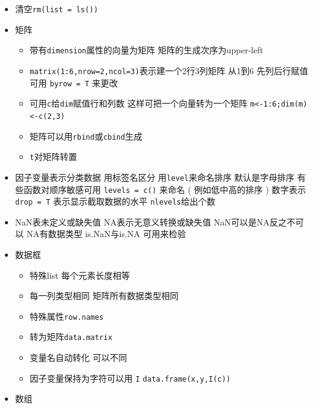 \documentclass[]{book}
\providecommand{\tightlist}{%
  \setlength{\itemsep}{0pt}\setlength{\parskip}{0pt}}
\begin{document}
\begin{itemize}
\tightlist
\item
  清空\texttt{rm(list\ =\ ls())}
\item
  矩阵

  \begin{itemize}
  \tightlist
  \item
    带有\texttt{dimension}属性的向量为矩阵 矩阵的生成次序为upper-left
  \item
    \texttt{matrix(1:6,nrow=2,ncol=3)}表示建一个2行3列矩阵 从1到6 先列后行赋值 可用 \texttt{byrow\ =\ T} 来更改
  \item
    可用\texttt{c}给\texttt{dim}赋值行和列数 这样可把一个向量转为一个矩阵 \texttt{m\textless{}-1:6;dim(m)\textless{}-c(2,3)}
  \item
    矩阵可以用\texttt{rbind}或\texttt{cbind}生成
  \item
    \texttt{t}对矩阵转置
  \end{itemize}
\item
  因子变量表示分类数据 用标签名区分 用\texttt{level}来命名排序 默认是字母排序 有些函数对顺序敏感可用 \texttt{levels\ =\ c()} 来命名 ( 例如低中高的排序 ) 数字表示 \texttt{drop\ =\ T} 表示显示截取数据的水平 \texttt{nlevels}给出个数
\item
  NaN表未定义或缺失值 NA表示无意义转换或缺失值 NaN可以是NA反之不可以 NA有数据类型 is.NaN与is.NA 可用来检验
\item
  数据框

  \begin{itemize}
  \tightlist
  \item
    特殊list 每个元素长度相等
  \item
    每一列类型相同 矩阵所有数据类型相同
  \item
    特殊属性\texttt{row.names}
  \item
    转为矩阵\texttt{data.matrix}
  \item
    变量名自动转化 可以不同
  \item
    因子变量保持为字符可以用 \texttt{I} \texttt{data.frame(x,y,I(c))}
  \end{itemize}
\item
  数组


\end{itemize}
\end{document}
